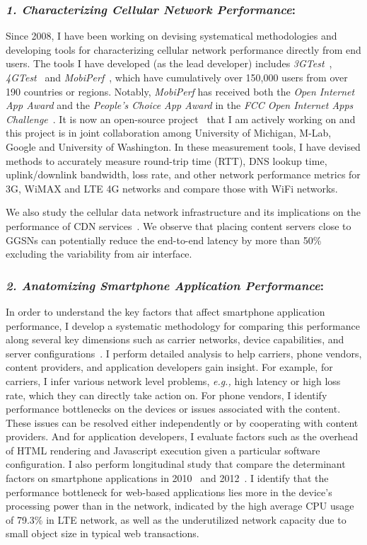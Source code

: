 \documentclass[10pt]{article}
\newcommand{\eg}{\emph{e.g.,}\xspace}
\begin{document}
\begin{small}
\subsubsection*{\emph{1. Characterizing Cellular Network Performance}:} Since 2008, I have been working on devising systematical methodologies and developing tools for characterizing cellular network performance directly from end users. The tools I have developed (as the lead developer) includes \emph{3GTest}~\cite{3gtest}, \emph{4GTest}~\cite{4gtest} and \emph{MobiPerf}~\cite{mobiperf}, which have cumulatively over 150,000 users from over 190 countries or regions. Notably, \emph{MobiPerf} has received both the \emph{Open Internet App Award} and the \emph{People's Choice App Award} in the \emph{FCC Open Internet Apps Challenge}~\cite{fcc.award}. It is now an open-source project~\cite{mobiperf.repo} that I am actively working on and this project is in joint collaboration among University of Michigan, M-Lab, Google and University of Washington. In these measurement tools, I have devised methods to accurately measure round-trip time (RTT), DNS lookup time, uplink/downlink bandwidth, loss rate, and other network performance metrics for 3G, WiMAX and LTE 4G networks and compare those with WiFi networks.

We also study the cellular data network infrastructure and its implications on the performance of CDN services~\cite{sigmetrics.cluster}. We observe that placing content servers close to GGSNs can potentially reduce the end-to-end latency by more than 50\% excluding the variability from air interface.

\subsubsection*{\emph{2. Anatomizing Smartphone Application Performance}:}

In order to understand the key factors that affect smartphone application performance, I develop a systematic methodology for comparing this performance along several key dimensions such as carrier networks, device capabilities, and server configurations~\cite{mobisys.3gtest}. I perform detailed analysis to help carriers, phone vendors, content providers, and application developers gain insight. For example, for carriers, I infer various network level problems, \eg high latency or high loss rate, which they can directly take action on. For phone vendors, I identify performance bottlenecks on the devices or issues associated with the content. These issues can be resolved either independently or by cooperating with content providers. And for application developers, I evaluate factors such as the overhead of HTML rendering and Javascript execution given a particular software configuration. I also perform longitudinal study that compare the determinant factors on smartphone applications in 2010~\cite{mobisys.3gtest} and 2012~\cite{huang12_mobisys}. I identify that the performance bottleneck for web-based applications lies more in the device’s processing power than in the network, indicated by the high average CPU usage of 79.3\% in LTE network, as well as the underutilized network capacity due to small object size in typical web transactions.


\end{small}
\end{document}
